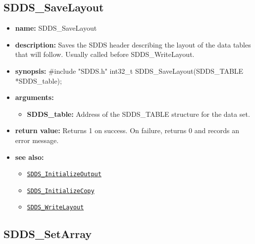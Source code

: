\documentclass[11pt]{article}
\newcommand{\progref}[1]{\hyperref[SDDS_#1]{\tt SDDS\_#1}}
\begin{document}
\subsection{SDDS\_SaveLayout}
\label{SDDS_SaveLayout}

\begin{itemize}
\item {\bf name:}\newline
SDDS\_SaveLayout
\item {\bf description:}\newline
Saves the SDDS header describing the layout of the data tables that will follow. Usually called before SDDS\_WriteLayout.
\item {\bf synopsis:} \#include "SDDS.h"\newline
int32\_t SDDS\_SaveLayout(SDDS\_TABLE *SDDS\_table);
\item {\bf arguments:}
\begin{itemize}
\item {\bf SDDS\_table:} Address of the SDDS\_TABLE structure for the data set.
\end{itemize}
\item {\bf return value:}\newline
Returns 1 on success. On failure, returns 0 and records an error message.
\item {\bf see also:}
\begin{itemize}
\item \progref{InitializeOutput}
\item \progref{InitializeCopy}
\item \progref{WriteLayout}
\end{itemize}
\end{itemize}

\subsection{SDDS\_SetArray}
\label{SDDS_SetArray}
\end{document}
